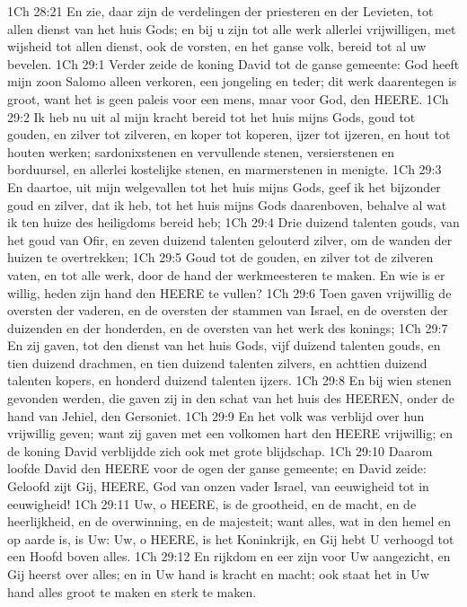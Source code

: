 1Ch 28:21  En zie, daar zijn de verdelingen der priesteren en der Levieten, tot allen dienst van het huis Gods; en bij u zijn tot alle werk allerlei vrijwilligen, met wijsheid tot allen dienst, ook de vorsten, en het ganse volk, bereid tot al uw bevelen.
1Ch 29:1  Verder zeide de koning David tot de ganse gemeente: God heeft mijn zoon Salomo alleen verkoren, een jongeling en teder; dit werk daarentegen is groot, want het is geen paleis voor een mens, maar voor God, den HEERE.
1Ch 29:2  Ik heb nu uit al mijn kracht bereid tot het huis mijns Gods, goud tot gouden, en zilver tot zilveren, en koper tot koperen, ijzer tot ijzeren, en hout tot houten werken; sardonixstenen en vervullende stenen, versierstenen en borduursel, en allerlei kostelijke stenen, en marmerstenen in menigte.
1Ch 29:3  En daartoe, uit mijn welgevallen tot het huis mijns Gods, geef ik het bijzonder goud en zilver, dat ik heb, tot het huis mijns Gods daarenboven, behalve al wat ik ten huize des heiligdoms bereid heb;
1Ch 29:4  Drie duizend talenten gouds, van het goud van Ofir, en zeven duizend talenten gelouterd zilver, om de wanden der huizen te overtrekken;
1Ch 29:5  Goud tot de gouden, en zilver tot de zilveren vaten, en tot alle werk, door de hand der werkmeesteren te maken. En wie is er willig, heden zijn hand den HEERE te vullen?
1Ch 29:6  Toen gaven vrijwillig de oversten der vaderen, en de oversten der stammen van Israel, en de oversten der duizenden en der honderden, en de oversten van het werk des konings;
1Ch 29:7  En zij gaven, tot den dienst van het huis Gods, vijf duizend talenten gouds, en tien duizend drachmen, en tien duizend talenten zilvers, en achttien duizend talenten kopers, en honderd duizend talenten ijzers.
1Ch 29:8  En bij wien stenen gevonden werden, die gaven zij in den schat van het huis des HEEREN, onder de hand van Jehiel, den Gersoniet.
1Ch 29:9  En het volk was verblijd over hun vrijwillig geven; want zij gaven met een volkomen hart den HEERE vrijwillig; en de koning David verblijdde zich ook met grote blijdschap.
1Ch 29:10  Daarom loofde David den HEERE voor de ogen der ganse gemeente; en David zeide: Geloofd zijt Gij, HEERE, God van onzen vader Israel, van eeuwigheid tot in eeuwigheid!
1Ch 29:11  Uw, o HEERE, is de grootheid, en de macht, en de heerlijkheid, en de overwinning, en de majesteit; want alles, wat in den hemel en op aarde is, is Uw: Uw, o HEERE, is het Koninkrijk, en Gij hebt U verhoogd tot een Hoofd boven alles.
1Ch 29:12  En rijkdom en eer zijn voor Uw aangezicht, en Gij heerst over alles; en in Uw hand is kracht en macht; ook staat het in Uw hand alles groot te maken en sterk te maken.
